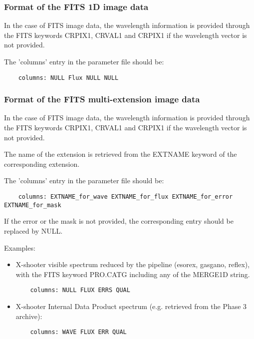\subsubsection{Format of the FITS 1D image data}\label{sec:inputspec_fits1dimg}
In the case of FITS image data, the wavelength information is provided through
the FITS keywords {\sc CRPIX1}, {\sc CRVAL1} and {\sc CRPIX1} if the wavelength
vector is not provided.

The 'columns' entry in the parameter file should be:
\begin{verbatim}
	columns: NULL Flux NULL NULL
\end{verbatim}

\subsubsection{Format of the FITS multi-extension image data}\label{sec_inputspec_fitsmultimg}
In the case of FITS image data, the wavelength information is provided through
the FITS keywords {\sc CRPIX1}, {\sc CRVAL1} and {\sc CRPIX1} if the wavelength
vector is not provided.

The name of the extension is retrieved from the {\sc EXTNAME} keyword of the
corresponding extension.

The 'columns' entry in the parameter file should be:
\begin{verbatim}
	columns: EXTNAME_for_wave EXTNAME_for_flux EXTNAME_for_error EXTNAME_for_mask
\end{verbatim}

If the error or the mask is not provided, the corresponding entry should be
replaced by {\sc NULL}.

Examples:
\begin{itemize}
	\item X-shooter visible spectrum reduced by the pipeline (esorex, gasgano,
          reflex), with the FITS keyword {\sc PRO.CATG} including any of the
          MERGE1D string.
\begin{verbatim}
	columns: NULL FLUX ERRS QUAL
\end{verbatim}
	\item X-shooter Internal Data Product spectrum (e.g. retrieved from the
          Phase 3 archive):
\begin{verbatim}
	columns: WAVE FLUX ERR QUAL
\end{verbatim}
\end{itemize}


